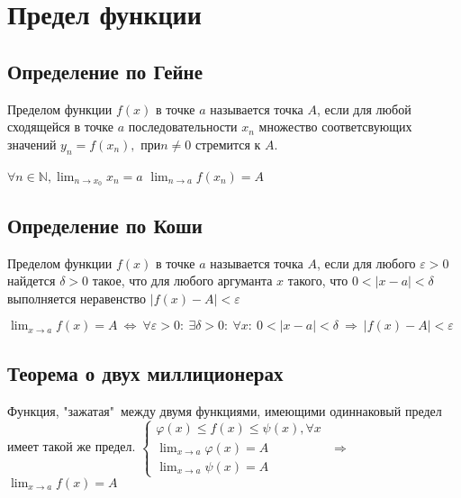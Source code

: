\chapter{Предел функции}
\section{Определение по Гейне}
Пределом функции $f(x)$ в точке $a$ называется точка $A$, если для любой сходящейся в точке $a$ 
последовательности $x_n$ множество соответсвующих значений $y_n = f(x_n),$ при$ n \neq 0$ стремится 
к $A$.\newline

$\displaystyle \forall n \in \mathbb{N}, \lim_{n \to x_0} x_n = a$ \newline
$\displaystyle \lim_{n \to a} f(x_n) = A$

\section{Определение по Коши}
Пределом функции $f(x)$ в точке $a$ называется точка $A$, если для любого $\varepsilon > 0$ найдется 
$\delta > 0$ такое, что для любого аргуманта $x$ такого, что $0 < |x - a|<\delta$ выполняется 
неравенство $|f(x) - A| < \varepsilon$ \newline

$\displaystyle \lim_{x \to a} f(x) = A \ \Leftrightarrow \ \forall \varepsilon > 0 : \ \exists 
\delta > 0: \ \forall x : \ 0 < |x - a| < \delta \ \Rightarrow \ |f(x) - A| < \varepsilon $\newline

\section{Теорема о двух миллиционерах}
Функция, "зажатая"\ между двумя функциями, имеющими одиннаковый предел имеет такой же 
предел.\newline
$\begin{cases}\varphi(x) \leq f(x) \leq \psi(x), \forall x \\ \displaystyle \lim_{x \to a} 
\varphi(x) = A
\\ \displaystyle \lim_{x \to a} \psi(x) = A\end{cases}$ $\Longrightarrow$ \qquad $\displaystyle 
\lim_{x \to a} f(x) = A$\newline\newline

